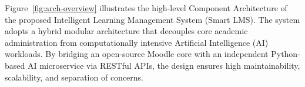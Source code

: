 Figure~\ref{fig:arch-overview} illustrates the high-level Component Architecture of the proposed Intelligent Learning Management System (Smart LMS). The system adopts a hybrid modular architecture that decouples core academic administration from computationally intensive Artificial Intelligence (AI) workloads. By bridging an open-source Moodle core with an independent Python-based AI microservice via RESTful APIs, the design ensures high maintainability, scalability, and separation of concerns.